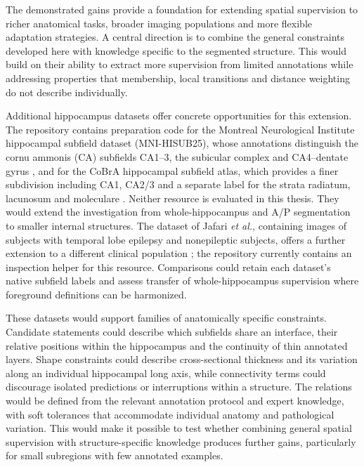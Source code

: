 \documentclass[12pt,a4paper]{article}
\begin{document}
The demonstrated gains provide a foundation for extending spatial
supervision to richer anatomical tasks, broader imaging populations and
more flexible adaptation strategies. A central direction is to combine
the general constraints developed here with knowledge specific to the
segmented structure. This would build on their ability to extract more
supervision from limited annotations while addressing properties that
membership, local transitions and distance weighting do not describe
individually.

Additional hippocampus datasets offer concrete opportunities for this
extension. The repository contains preparation code for the Montreal Neurological Institute hippocampal subfield dataset
(MNI-HISUB25), whose annotations distinguish the cornu ammonis
(CA) subfields CA1--3, the subicular complex and CA4--dentate
gyrus \cite{kulaga2015subfields}, and for the CoBrA hippocampal subfield
atlas, which provides a finer subdivision including CA1, CA2/3 and a
separate label for the strata radiatum, lacunosum and moleculare
\cite{winterburn2013atlas}. Neither resource is evaluated in this thesis.
They would extend the investigation from whole-hippocampus and A/P
segmentation to smaller internal structures. The dataset of Jafari \emph{et al.}, containing
images of subjects with temporal lobe epilepsy and nonepileptic subjects,
offers a further extension to a different clinical population
\cite{jafari2011dataset}; the repository currently contains an inspection
helper for this resource. Comparisons could retain each dataset's native
subfield labels and assess transfer of whole-hippocampus supervision where
foreground definitions can be harmonized.

These datasets would support families of anatomically specific
constraints. Candidate statements could describe which subfields share
an interface, their relative positions within the hippocampus and the
continuity of thin annotated layers. Shape constraints could describe
cross-sectional thickness and its variation along an individual
hippocampal long axis, while connectivity terms could discourage isolated
predictions or interruptions within a structure. The relations would be
defined from the relevant annotation protocol and expert knowledge, with
soft tolerances that accommodate individual anatomy and pathological
variation. This would make it possible to test whether combining general
spatial supervision with structure-specific knowledge produces further
gains, particularly for small subregions with few annotated examples.
\end{document}

